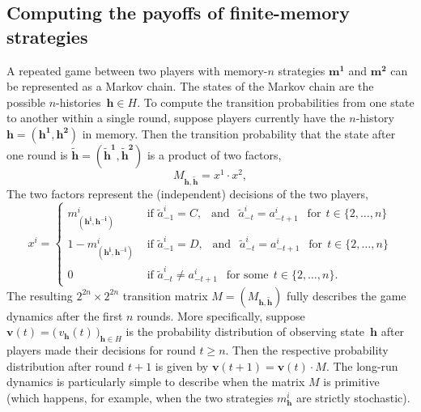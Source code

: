 \documentclass[9pt,twoside,lineno]{pnas-new}
\theoremstyle{plainCl1}
\theoremstyle{plainCl2}
\begin{document}
\subsection{Computing the payoffs of finite-memory strategies} \label{Sec:PayoffComputation}


A repeated game between two players with memory-\(n\) strategies \(\mathbf{m^{1}}\) and \(\mathbf{m^{2}}\) can be represented as a Markov chain. 
The states of the Markov chain are the possible $n$-histories~$\mathbf{h}\!\in\!H$. 
To compute the transition probabilities from one state to another within a single round, suppose  players currently have the $n$-history \(\mathbf{h}\!=\!(\mathbf{h^1}, \mathbf{h^2})\) in memory.
Then the transition probability that the state after one round is $\mathbf{\tilde h}\!=\!(\mathbf{\tilde h^1},\mathbf{\tilde h^2})$ is a product of two factors,
\begin{equation}\label{Eq:TransitionMatrix}
M_{\mathbf{h}, \mathbf{\tilde h}} = x^1 \cdot x^2,
\end{equation}
The two factors represent the (independent) decisions of the two players,
\begin{equation}
x^i = \left\{
\begin{array}{ll}
  m^{i}_{(\mathbf{h^i},\mathbf{h^{-i}})} & \text{ if } \tilde{a}^i_{-1} \!=\! C, ~~\text{ and }~~ \tilde a^i_{-t} \!=\! a^i_{-t + 1} ~~\text{ for}~~t\!\in\!\{2,\ldots,n\}\\[0.1cm]
  1 \!-\! m^{i}_{(\mathbf{h^i},\mathbf{h^{-i}})} & \text{ if } \tilde{a}^i_{-1} \!=\! D, ~~\text{ and }~~ \tilde a^i_{-t} \!=\! a^i_{-t + 1} ~~\text{ for}~~t\!\in\!\{2,\ldots,n\}\\[0.1cm]
  0 & \text{ if } \tilde a^i_{-t} \neq  a^i_{-t + 1}~~\text{ for some}~~t\!\in\!\{2,\ldots,n\}.
\end{array}
\right.
\end{equation}
The resulting  \(2^{2n}\! \times\! 2^{2n}\) transition matrix $M\!=\!(M_{\mathbf{h},\mathbf{\tilde h}})$ fully describes the game dynamics after the first $n$ rounds. 
More specifically, suppose $\mathbf{v}(t) \!=\! \big(\,v_\mathbf{h}(t)\,\big)_{\mathbf{h}\in H}$ is the probability distribution of observing state~$\mathbf{h}$ after players made their decisions for round $t\!\ge\!n$.
Then the respective probability distribution after round $t\!+\!1$ is given by $\mathbf{v}(t\!+\!1) \!=\! \mathbf{v}(t)\cdot M$. 
The long-run dynamics is particularly simple to describe when the matrix $M$ is primitive (which happens, for example, when the two strategies $m^i_\mathbf{h}$ are strictly stochastic). 
\end{document}
